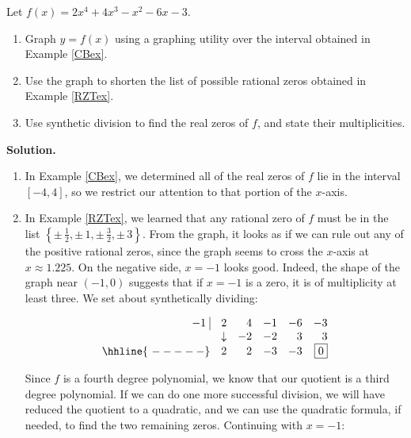 \begin{ex}  Let $f(x) = 2x^4+4x^3-x^2-6x-3$.  

\begin{enumerate}

\item  Graph $y=f(x)$ using a graphing utility over the interval  obtained in Example \ref{CBex}.

\item  Use the graph to shorten the list of possible rational zeros obtained in Example \ref{RZTex}.

\item  Use synthetic division to find the real zeros of $f$, and state their multiplicities.


\end{enumerate}

{\bf Solution.}

\begin{enumerate}

\item  In Example \ref{CBex}, we determined all of the real zeros of $f$ lie in the interval $[-4, 4]$, so we restrict our attention to that portion of the $x$-axis.

\item  In Example \ref{RZTex}, we learned that any rational zero of $f$ must be in the list $\left\{\pm \, \frac{1}{2}, \pm \, 1, \pm \, \frac{3}{2}, \pm \, 3\right\}$.  From the graph, it looks as if we can rule out any of the positive rational zeros, since the graph seems to cross the $x$-axis at $x \approx 1.225$.  On the negative side, $x=-1$ looks good. Indeed,  the shape  of the graph near $(-1,0)$ suggests that if $x=-1$ is a zero, it is of multiplicity at least three.  We set about synthetically dividing:
 
\[\begin{array}{rrrrrr}

 -1 \, \, \vline& 2 & 4 & -1  & -6 & -3 \\

  & \downarrow     &  -2  &  -2  & 3 & 3\\ \hhline{~-----} 
  
  &  2            &   2  & -3 & -3 &  \fbox{$0$}  \\

\end{array}\]

Since $f$ is a fourth degree polynomial, we know that our quotient is a third degree polynomial.  If we can do one more successful division, we will have reduced the quotient  to a quadratic, and we can use the quadratic formula, if needed, to find the two  remaining  zeros.  Continuing with $x=-1$:


\end{enumerate}
\end{ex}
